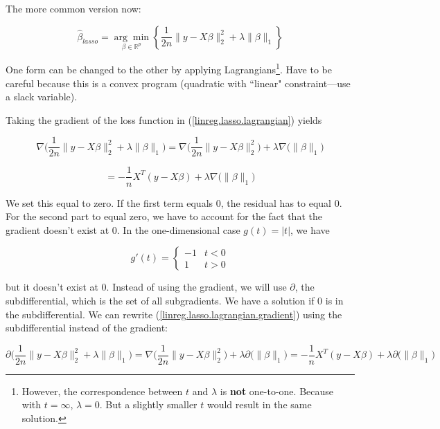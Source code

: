 The more common version now:

\begin{equation}\label{linreg.lasso.lagrangian}
\hat{\beta}_{lasso} =\underset{\beta \in \mathbb{R}^p}{\arg \min} \left\{ \frac{1}{2n}\lVert y - X \beta \rVert_2^2   + \lambda \lVert \beta \rVert_1 \right\}
\end{equation}

One form can be changed to the other by applying Lagrangians\footnote{However, the correspondence between \(t\) and \(\lambda\) is \textbf{not} one-to-one. Because with \(t = \infty\), \(\lambda =0\). But a slightly smaller \(t\) would result in the same solution.}. Have to be careful because this is a convex program (quadratic with ``linear" constraint---use a slack variable). 

Taking the gradient of the loss function in (\ref{linreg.lasso.lagrangian}) yields

\[
\nabla \bigg(  \frac{1}{2n}\lVert y - X \beta \rVert_2^2   + \lambda \lVert \beta \rVert_1 \bigg) = \nabla   \bigg( \frac{1}{2n}\lVert y - X \beta \rVert_2^2   \bigg) + \lambda \nabla \big( \lVert \beta \rVert_1 \big)
\]

\begin{equation}\label{linreg.lasso.lagrangian.gradient}
= - \frac{1}{n} X^T(y - X \beta) + \lambda \nabla  \big( \lVert \beta \rVert_1 \big)
\end{equation}

We set this equal to zero. If the first term equals 0, the residual has to equal 0. For the second part to equal zero, we have to account for the fact that the gradient doesn't exist at 0. In the one-dimensional case \(g(t) = |t|\), we have

\[
g'(t) = \begin{cases}
-1 & t < 0 \\
1 & t > 0
\end{cases}
\]

but it doesn't exist at 0. Instead of using the gradient, we will use \(\partial\), the subdifferential, which is the set of all subgradients. We have a solution if 0 is in the subdifferential. We can rewrite (\ref{linreg.lasso.lagrangian.gradient}) using the subdifferential instead of the gradient:

\[
\partial \bigg(  \frac{1}{2n}\lVert y - X \beta \rVert_2^2   + \lambda \lVert \beta \rVert_1 \bigg) = \nabla \bigg(  \frac{1}{2n}\lVert y - X \beta \rVert_2^2  \bigg)  + \lambda \partial \big( \lVert \beta \rVert_1 \big)  =  - \frac{1}{n} X^T(y - X \beta) + \lambda \partial \big( \lVert \beta \rVert_1 \big)
\]

